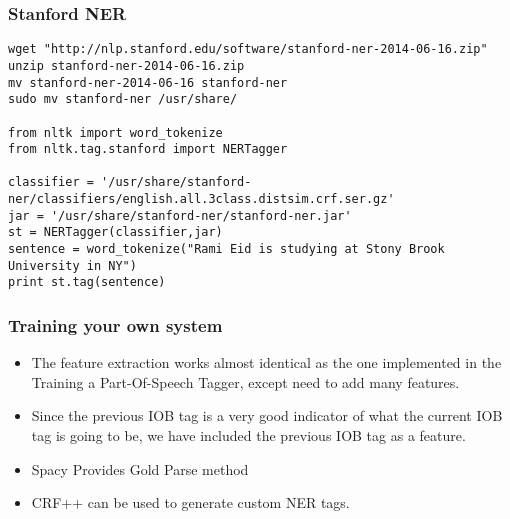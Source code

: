 
\begin{frame}[fragile]\frametitle{Stanford NER}
  \begin{lstlisting}
wget "http://nlp.stanford.edu/software/stanford-ner-2014-06-16.zip"
unzip stanford-ner-2014-06-16.zip
mv stanford-ner-2014-06-16 stanford-ner
sudo mv stanford-ner /usr/share/

from nltk import word_tokenize
from nltk.tag.stanford import NERTagger
 
classifier = '/usr/share/stanford-ner/classifiers/english.all.3class.distsim.crf.ser.gz'
jar = '/usr/share/stanford-ner/stanford-ner.jar'
st = NERTagger(classifier,jar)
sentence = word_tokenize("Rami Eid is studying at Stony Brook University in NY")
print st.tag(sentence)
  \end{lstlisting}
\end{frame}

\begin{frame}[fragile]\frametitle{Training your own system}
  \begin{itemize}
  \item The feature extraction works almost identical as the one implemented in the Training a Part-Of-Speech Tagger, except need to add many features.
  \item Since the previous IOB tag is a very good indicator of what the current IOB tag is going to be, we have included the previous IOB tag as a feature.
  \item Spacy Provides Gold Parse method
  \item CRF++ can be used to generate custom NER tags.
  \end{itemize}
\end{frame}



